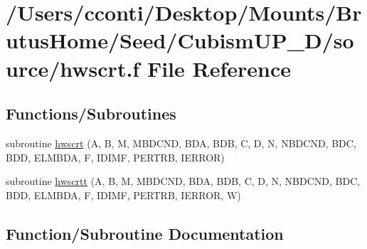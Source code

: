 \hypertarget{hwscrt_8f}{}\section{/\+Users/cconti/\+Desktop/\+Mounts/\+Brutus\+Home/\+Seed/\+Cubism\+U\+P\+\_\+D/source/hwscrt.f File Reference}
\label{hwscrt_8f}
\subsection*{Functions/\+Subroutines}
\begin{DoxyCompactItemize}
\item 
subroutine \hyperlink{hwscrt_8f_a56abb5c96afe821e6901842afb8ca482}{hwscrt} (A, B, M, M\+B\+D\+C\+N\+D, B\+D\+A, B\+D\+B, C, D, N, N\+B\+D\+C\+N\+D, B\+D\+C, B\+D\+D, E\+L\+M\+B\+D\+A, F, I\+D\+I\+M\+F, P\+E\+R\+T\+R\+B, I\+E\+R\+R\+O\+R)
\item 
subroutine \hyperlink{hwscrt_8f_a4326581b64dbb81606edbc02efaef54f}{hwscrtt} (A, B, M, M\+B\+D\+C\+N\+D, B\+D\+A, B\+D\+B, C, D, N, N\+B\+D\+C\+N\+D, B\+D\+C, B\+D\+D, E\+L\+M\+B\+D\+A, F, I\+D\+I\+M\+F, P\+E\+R\+T\+R\+B, I\+E\+R\+R\+O\+R, W)
\end{DoxyCompactItemize}


\subsection{Function/\+Subroutine Documentation}
\hypertarget{hwscrt_8f_a56abb5c96afe821e6901842afb8ca482}{}
